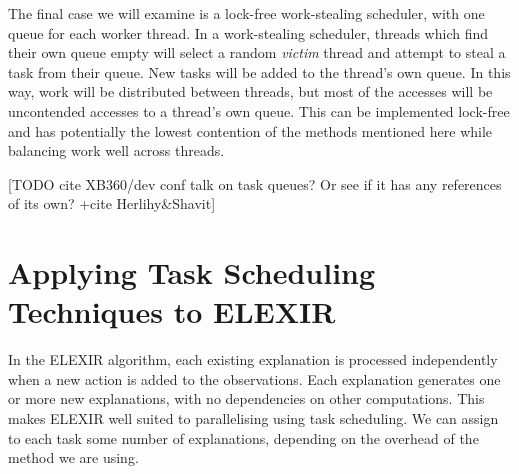 The final case we will examine is a lock-free work-stealing scheduler, with one queue for each worker thread. In a work-stealing scheduler, threads which find their own queue empty will select a random \emph{victim} thread and attempt to steal a task from their queue. New tasks will be added to the thread's own queue. In this way, work will be distributed between threads, but most of the accesses will be uncontended accesses to a thread's own queue. This can be implemented lock-free and has potentially the lowest contention of the methods mentioned here while balancing work well across threads.

[TODO cite XB360/dev conf talk on task queues? Or see if it has any references of its own? +cite Herlihy\&Shavit]

\section{Applying Task Scheduling Techniques to ELEXIR}

In the ELEXIR algorithm, each existing explanation is processed independently when a new action is added to the observations. Each explanation generates one or more new explanations, with no dependencies on other computations. This makes ELEXIR well suited to parallelising using task scheduling. We can assign to each task some number of explanations, depending on the overhead of the method we are using.
